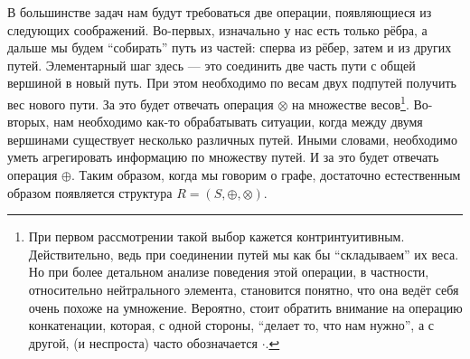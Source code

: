 В большинстве задач нам будут требоваться две операции, появляющиеся из следующих соображений. Во-первых, изначально у нас есть только рёбра, а дальше мы будем ``собирать'' путь из частей: сперва из рёбер, затем и из других путей. Элементарный шаг здесь --- это соединить две часть пути с общей вершиной в новый путь. При этом необходимо по весам двух подпутей получить вес нового пути. За это будет отвечать операция $\otimes$ на множестве весов\footnote{При первом рассмотрении такой выбор кажется контринтуитивным. Действительно, ведь при соединении путей мы как бы ``складываем'' их веса. Но при более детальном анализе поведения этой операции, в частности, относительно нейтрального элемента, становится понятно, что она ведёт себя очень похоже на умножение. Вероятно, стоит обратить внимание на операцию конкатенации, которая, с одной стороны, ``делает то, что нам нужно'', а с другой, (и неспроста) часто обозначается $\cdot$.}. Во-вторых, нам необходимо как-то обрабатывать ситуации, когда между двумя вершинами существует несколько различных путей. Иными словами, необходимо уметь агрегировать информацию по множеству путей. И за это будет отвечать операция $\oplus$. Таким образом, когда мы говорим о графе, достаточно естественным образом появляется структура $R=(S,\oplus,\otimes)$.

